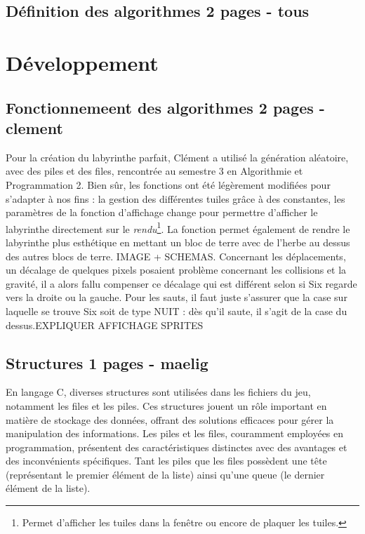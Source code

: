 \documentclass[10pt]{article}
\begin{document}
   \subsection{Définition des algorithmes 2 pages - tous}

\section{Développement}
   \subsection{Fonctionnemeent des algorithmes 2 pages - clement}
   Pour la création du labyrinthe parfait, Clément a utilisé la génération aléatoire, avec des piles et des files, rencontrée au semestre 3 en Algorithmie et Programmation 2.
   Bien sûr, les fonctions ont été légèrement modifiées pour s'adapter à nos fins : la gestion des différentes tuiles grâce à des constantes, les 
   paramètres de la fonction d'affichage change pour permettre d'afficher le labyrinthe directement sur le \textit{rendu}\footnote{
   Permet d'afficher les tuiles dans la fenêtre ou encore de plaquer les tuiles.}. La fonction permet également de rendre le labyrinthe plus esthétique
   en mettant un bloc de terre avec de l'herbe au dessus des autres blocs de terre. IMAGE + SCHEMAS. Concernant les déplacements, un décalage de quelques
   pixels posaient problème concernant les collisions et la gravité, il a alors fallu compenser ce décalage qui est différent selon si Six regarde vers
   la droite ou la gauche. Pour les sauts, il faut juste s'assurer que la case sur laquelle se trouve Six soit de type NUIT : dès qu'il saute, il s'agit
   de la case du dessus.EXPLIQUER AFFICHAGE SPRITES
   \subsection{Structures 1 pages - maelig}

En langage C, diverses structures sont utilisées dans les fichiers du jeu, notamment les files et les piles. Ces structures jouent un rôle important en matière de stockage des données, offrant des solutions efficaces pour gérer la manipulation des informations. Les piles et les files, couramment employées en programmation, présentent des caractéristiques distinctes avec des avantages et des inconvénients spécifiques. Tant les piles que les files possèdent une tête (représentant le premier élément de la liste) ainsi qu'une queue (le dernier élément de la liste).
\end{document}
